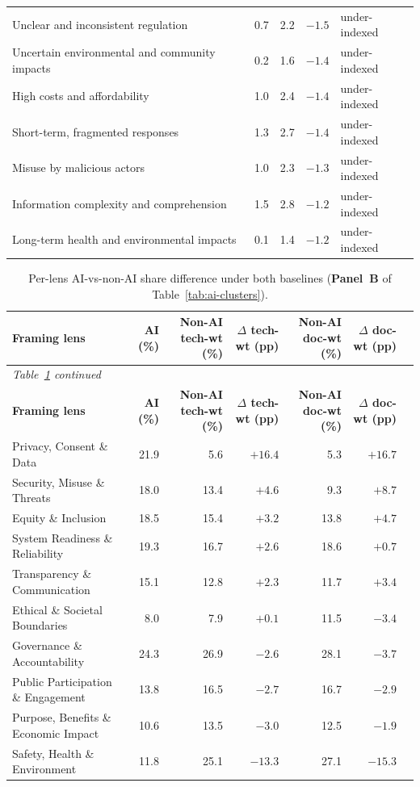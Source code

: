 \documentclass[11pt, a4paper]{article}
\begin{document}
\begin{longtable}{@{}lrrrp{3cm}@{}}
Unclear and inconsistent regulation            & 0.7 & 2.2 & $-1.5$ & under-indexed \\
Uncertain environmental and community impacts  & 0.2 & 1.6 & $-1.4$ & under-indexed \\
High costs and affordability                   & 1.0 & 2.4 & $-1.4$ & under-indexed \\
Short-term, fragmented responses               & 1.3 & 2.7 & $-1.4$ & under-indexed \\
Misuse by malicious actors                     & 1.0 & 2.3 & $-1.3$ & under-indexed \\
Information complexity and comprehension       & 1.5 & 2.8 & $-1.2$ & under-indexed \\
Long-term health and environmental impacts     & 0.1 & 1.4 & $-1.2$ & under-indexed \\
\end{longtable}

\begin{longtable}{@{}lrrrrrr@{}}
\caption{Per-lens AI-vs-non-AI share difference under both baselines
(\textbf{Panel~B} of Table~\ref{tab:ai-clusters}).}
\label{tab:ai-lenses}\\
\toprule
\textbf{Framing lens} & \textbf{AI (\%)} &
\textbf{Non-AI tech-wt (\%)} & \textbf{$\Delta$ tech-wt (pp)} &
\textbf{Non-AI doc-wt (\%)} & \textbf{$\Delta$ doc-wt (pp)} \\
\midrule
\endfirsthead
\multicolumn{6}{l}{\small\textit{Table~\ref{tab:ai-lenses} continued}}\\
\toprule
\textbf{Framing lens} & \textbf{AI (\%)} &
\textbf{Non-AI tech-wt (\%)} & \textbf{$\Delta$ tech-wt (pp)} &
\textbf{Non-AI doc-wt (\%)} & \textbf{$\Delta$ doc-wt (pp)} \\
\midrule
\endhead
\bottomrule
\endlastfoot
Privacy, Consent \& Data             & 21.9 &  5.6 & $+16.4$ &  5.3 & $+16.7$ \\
Security, Misuse \& Threats          & 18.0 & 13.4 &  $+4.6$ &  9.3 &  $+8.7$ \\
Equity \& Inclusion                  & 18.5 & 15.4 &  $+3.2$ & 13.8 &  $+4.7$ \\
System Readiness \& Reliability      & 19.3 & 16.7 &  $+2.6$ & 18.6 &  $+0.7$ \\
Transparency \& Communication        & 15.1 & 12.8 &  $+2.3$ & 11.7 &  $+3.4$ \\
Ethical \& Societal Boundaries       &  8.0 &  7.9 &  $+0.1$ & 11.5 &  $-3.4$ \\
Governance \& Accountability         & 24.3 & 26.9 &  $-2.6$ & 28.1 &  $-3.7$ \\
Public Participation \& Engagement   & 13.8 & 16.5 &  $-2.7$ & 16.7 &  $-2.9$ \\
Purpose, Benefits \& Economic Impact & 10.6 & 13.5 &  $-3.0$ & 12.5 &  $-1.9$ \\
Safety, Health \& Environment        & 11.8 & 25.1 & $-13.3$ & 27.1 & $-15.3$ \\
\end{longtable}
\end{document}
